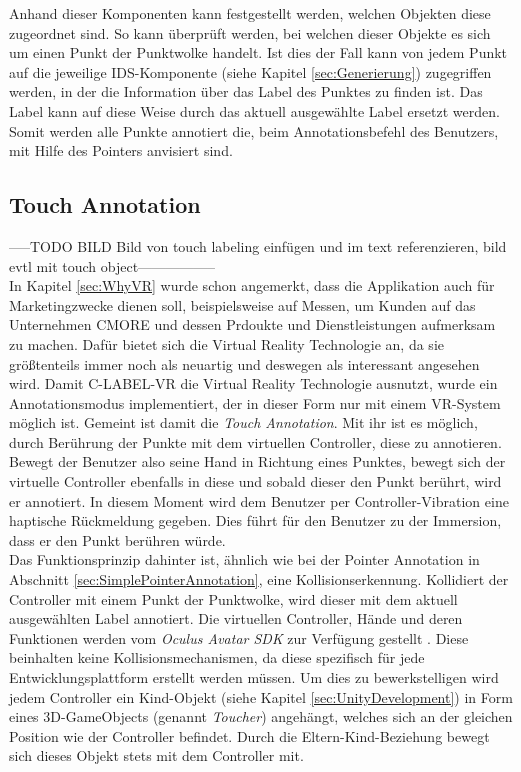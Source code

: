 Anhand dieser Komponenten kann festgestellt werden, welchen Objekten diese zugeordnet sind. So kann überprüft werden, bei welchen dieser Objekte es sich um einen Punkt der Punktwolke handelt. Ist dies der Fall kann von jedem Punkt auf die jeweilige IDS-Komponente (siehe Kapitel \ref{sec:Generierung}) zugegriffen werden, in der die Information über das Label des Punktes zu finden ist. Das Label kann auf diese Weise durch das aktuell ausgewählte Label ersetzt werden. Somit werden alle Punkte annotiert die, beim Annotationsbefehl des Benutzers, mit Hilfe des Pointers anvisiert sind.

\subsection{Touch Annotation}
\label{sec:TouchAnnotation}

-----TODO BILD Bild von touch labeling einfügen und im text referenzieren, bild evtl mit touch object-----------------\\

In Kapitel \ref{sec:WhyVR} wurde schon angemerkt, dass die Applikation auch für Marketingzwecke dienen soll, beispielsweise auf Messen, um Kunden auf das Unternehmen CMORE und dessen Prdoukte und Dienstleistungen aufmerksam zu machen. Dafür bietet sich die Virtual Reality Technologie an, da sie größtenteils immer noch als neuartig und deswegen als interessant angesehen wird. Damit C-LABEL-VR die Virtual Reality Technologie ausnutzt, wurde ein Annotationsmodus implementiert, der in dieser Form nur mit einem VR-System möglich ist. Gemeint ist damit die \textit{Touch Annotation}. Mit ihr ist es möglich, durch Berührung der Punkte mit dem virtuellen Controller, diese zu annotieren. Bewegt der Benutzer also seine Hand in Richtung eines Punktes, bewegt sich der virtuelle Controller ebenfalls in diese und sobald dieser den Punkt berührt, wird er annotiert. In diesem Moment wird dem Benutzer per Controller-Vibration eine haptische Rückmeldung gegeben. Dies führt für den Benutzer zu der Immersion, dass er den Punkt berühren würde.\\

Das Funktionsprinzip dahinter ist, ähnlich wie bei der Pointer Annotation in Abschnitt \ref{sec:SimplePointerAnnotation}, eine Kollisionserkennung. Kollidiert der Controller mit einem Punkt der Punktwolke, wird dieser mit dem aktuell ausgewählten Label annotiert. Die virtuellen Controller, Hände und deren Funktionen werden vom \textit{Oculus Avatar SDK} zur Verfügung gestellt \cite{bib:AvatarSDK}. Diese beinhalten keine Kollisionsmechanismen, da diese spezifisch für jede Entwicklungsplattform erstellt werden müssen. Um dies zu bewerkstelligen wird jedem Controller ein Kind-Objekt (siehe Kapitel \ref{sec:UnityDevelopment}) in Form eines 3D-GameObjects (genannt \textit{Toucher}) angehängt, welches sich an der gleichen Position wie der Controller befindet. Durch die Eltern-Kind-Beziehung bewegt sich dieses Objekt stets mit dem Controller mit.\\

